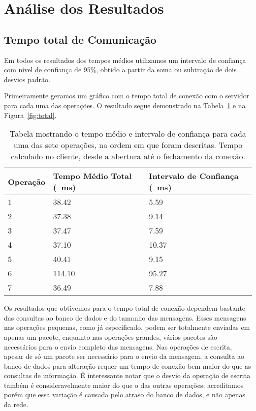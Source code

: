 \documentclass[12pt,a4paper]{article}
\begin{document}
\section{Análise dos Resultados}

\subsection{Tempo total de Comunicação}

Em todos os resultados dos tempos médios utilizamos um intervalo de confiança com nível de confiança de 95\%, obtido a partir da soma ou subtração de dois desvios padrão.
    
Primeiramente geramos um gráfico com o tempo total de conexão com o servidor para cada uma das operações. O resultado segue demonstrado na Tabela~\ref{table:total} e na Figura~\ref{fig:total}.

\begin{table}[h]
\centering
\caption{Tabela mostrando o tempo médio e intervalo de confiança para cada uma das sete operações, na ordem em que foram descritas. Tempo calculado no cliente, desde a abertura até o fechamento da conexão.}
\label{table:total}
\begin{tabular}{lll}
Operação & Tempo Médio Total (\SI{}{\milli\second}) & Intervalo de Confiança (\SI{}{\milli\second})\\ \hline
1        & 38.42           & 5.59   \\
2        & 37.38           & 9.14   \\
3        & 37.47           & 7.59   \\
4        & 37.10           & 10.37  \\
5        & 40.41           & 9.15   \\
6        & 114.10          & 95.27  \\
7        & 36.49           & 7.88  
\end{tabular}
\end{table}


Os resultados que obtivemos para o tempo total de conexão dependem bastante das consultas ao banco de dados e do tamanho das mensagens. Esses mensagens nas operações pequenas, como já especificado, podem ser totalmente enviadas em apenas um pacote, enquanto nas operações grandes, vários pacotes são necessários para o envio completo das mensagens. Nas operações de escrita, apesar de só um pacote ser necessário para o envio da mensagem, a consulta ao banco de dados para alteração requer um tempo de conexão bem maior do que as consultas de informação. É interessante notar que o desvio da operação de escrita também é consideravelmente maior do que o das outras operações; acreditamos porém que essa variação é causada pelo atraso do banco de dados, e não apenas da rede.
\end{document}
